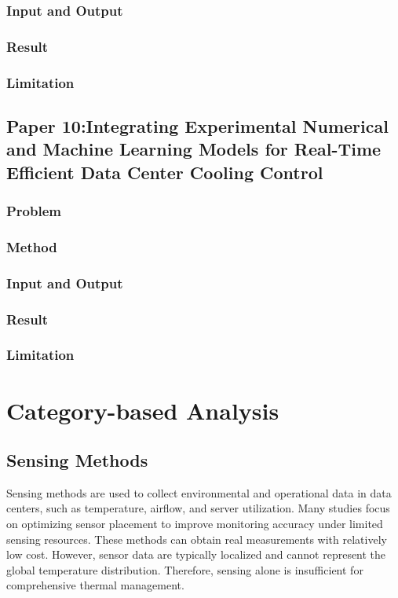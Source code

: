\documentclass[12pt,a4paper]{article}
\begin{document}
    \subsubsection{Input and Output}
    \subsubsection{Result}
    \subsubsection{Limitation}


\newpage
\subsection{Paper 10:Integrating Experimental Numerical and Machine Learning Models for Real-Time Efficient Data Center Cooling Control}
    \subsubsection{Problem}
    \subsubsection{Method}
    \subsubsection{Input and Output}
    \subsubsection{Result}
    \subsubsection{Limitation}
\newpage

\section{Category-based Analysis}

    \subsection{Sensing Methods}
    Sensing methods are used to collect environmental and operational data in data centers, such as temperature, airflow, and server utilization. Many studies focus on optimizing sensor placement to improve monitoring accuracy under limited sensing resources. These methods can obtain real measurements with relatively low cost. However, sensor data are typically localized and cannot represent the global temperature distribution. Therefore, sensing alone is insufficient for comprehensive thermal management.
\end{document}
